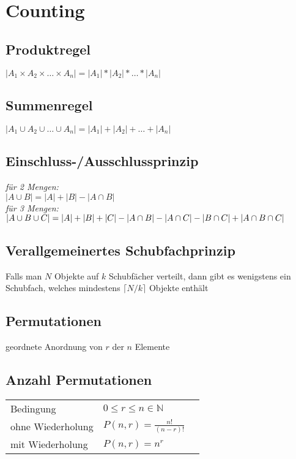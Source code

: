 \section{Counting}

\subsection{Produktregel}
$ | A_1 \times A_2 \times \dots \times A_n | = |A_1| * |A_2| * \dots * |A_n| $

\subsection{Summenregel}
$ | A_1 \cup A_2 \cup \dots \cup A_n | = |A_1| + |A_2| + \dots + |A_n| $

\subsection{Einschluss-/Ausschlussprinzip}
\textit{für 2 Mengen:} \\
$ | A \cup B | = |A| + |B| - |A \cap B| $ \\
\newline
\textit{für 3 Mengen:} \\
$ | A \cup B \cup C | = |A| + |B| + |C| \\ - |A \cap B| - |A \cap C| - |B \cap C| + |A \cap B \cap C|$

\subsection{Verallgemeinertes Schubfachprinzip}
Falls man $N$ Objekte auf $k$ Schubfächer verteilt, dann gibt es wenigstens ein Schubfach, 
welches mindestens $\lceil N/k \rceil$ Objekte enthält

\subsection{Permutationen}
geordnete Anordnung von $r$ der $n$ Elemente

\subsection{Anzahl Permutationen}
\begin{tabular}{lll}
    Bedingung & $0 \leq r \leq n \in \mathbb{N} $ \\
    ohne Wiederholung & $P(n,r) = \frac{n!}{(n-r)!}$ \\
    mit Wiederholung & $P(n,r) = n^r$ \\
\end{tabular}

